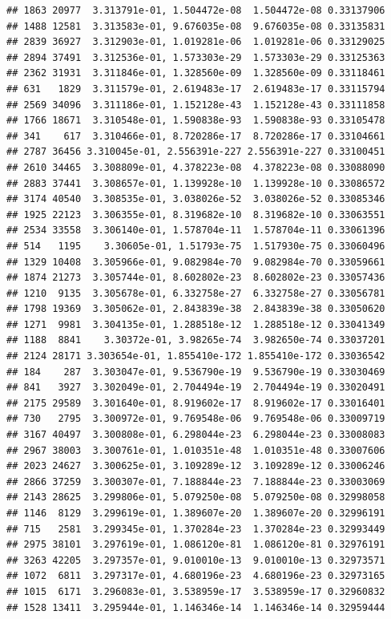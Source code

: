 \documentclass[
]{article}
\begin{document}
\begin{verbatim}
## 1863 20977  3.313791e-01, 1.504472e-08  1.504472e-08 0.33137906
## 1488 12581  3.313583e-01, 9.676035e-08  9.676035e-08 0.33135831
## 2839 36927  3.312903e-01, 1.019281e-06  1.019281e-06 0.33129025
## 2894 37491  3.312536e-01, 1.573303e-29  1.573303e-29 0.33125363
## 2362 31931  3.311846e-01, 1.328560e-09  1.328560e-09 0.33118461
## 631   1829  3.311579e-01, 2.619483e-17  2.619483e-17 0.33115794
## 2569 34096  3.311186e-01, 1.152128e-43  1.152128e-43 0.33111858
## 1766 18671  3.310548e-01, 1.590838e-93  1.590838e-93 0.33105478
## 341    617  3.310466e-01, 8.720286e-17  8.720286e-17 0.33104661
## 2787 36456 3.310045e-01, 2.556391e-227 2.556391e-227 0.33100451
## 2610 34465  3.308809e-01, 4.378223e-08  4.378223e-08 0.33088090
## 2883 37441  3.308657e-01, 1.139928e-10  1.139928e-10 0.33086572
## 3174 40540  3.308535e-01, 3.038026e-52  3.038026e-52 0.33085346
## 1925 22123  3.306355e-01, 8.319682e-10  8.319682e-10 0.33063551
## 2534 33558  3.306140e-01, 1.578704e-11  1.578704e-11 0.33061396
## 514   1195    3.30605e-01, 1.51793e-75  1.517930e-75 0.33060496
## 1329 10408  3.305966e-01, 9.082984e-70  9.082984e-70 0.33059661
## 1874 21273  3.305744e-01, 8.602802e-23  8.602802e-23 0.33057436
## 1210  9135  3.305678e-01, 6.332758e-27  6.332758e-27 0.33056781
## 1798 19369  3.305062e-01, 2.843839e-38  2.843839e-38 0.33050620
## 1271  9981  3.304135e-01, 1.288518e-12  1.288518e-12 0.33041349
## 1188  8841    3.30372e-01, 3.98265e-74  3.982650e-74 0.33037201
## 2124 28171 3.303654e-01, 1.855410e-172 1.855410e-172 0.33036542
## 184    287  3.303047e-01, 9.536790e-19  9.536790e-19 0.33030469
## 841   3927  3.302049e-01, 2.704494e-19  2.704494e-19 0.33020491
## 2175 29589  3.301640e-01, 8.919602e-17  8.919602e-17 0.33016401
## 730   2795  3.300972e-01, 9.769548e-06  9.769548e-06 0.33009719
## 3167 40497  3.300808e-01, 6.298044e-23  6.298044e-23 0.33008083
## 2967 38003  3.300761e-01, 1.010351e-48  1.010351e-48 0.33007606
## 2023 24627  3.300625e-01, 3.109289e-12  3.109289e-12 0.33006246
## 2866 37259  3.300307e-01, 7.188844e-23  7.188844e-23 0.33003069
## 2143 28625  3.299806e-01, 5.079250e-08  5.079250e-08 0.32998058
## 1146  8129  3.299619e-01, 1.389607e-20  1.389607e-20 0.32996191
## 715   2581  3.299345e-01, 1.370284e-23  1.370284e-23 0.32993449
## 2975 38101  3.297619e-01, 1.086120e-81  1.086120e-81 0.32976191
## 3263 42205  3.297357e-01, 9.010010e-13  9.010010e-13 0.32973571
## 1072  6811  3.297317e-01, 4.680196e-23  4.680196e-23 0.32973165
## 1015  6171  3.296083e-01, 3.538959e-17  3.538959e-17 0.32960832
## 1528 13411  3.295944e-01, 1.146346e-14  1.146346e-14 0.32959444

\end{verbatim}
\end{document}
